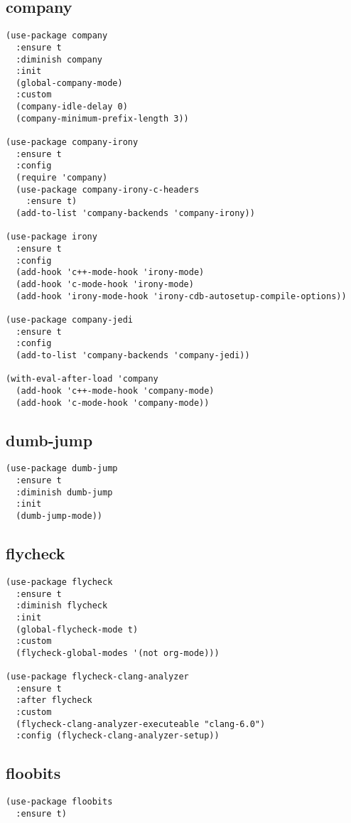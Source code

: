 \documentclass[11pt]{article}
\begin{document}
\subsection{company}
\label{sec-2-7}
\begin{verbatim}
(use-package company
  :ensure t
  :diminish company
  :init
  (global-company-mode)
  :custom
  (company-idle-delay 0)
  (company-minimum-prefix-length 3))

(use-package company-irony
  :ensure t
  :config
  (require 'company)
  (use-package company-irony-c-headers
    :ensure t)
  (add-to-list 'company-backends 'company-irony))

(use-package irony
  :ensure t
  :config
  (add-hook 'c++-mode-hook 'irony-mode)
  (add-hook 'c-mode-hook 'irony-mode)
  (add-hook 'irony-mode-hook 'irony-cdb-autosetup-compile-options))

(use-package company-jedi
  :ensure t
  :config
  (add-to-list 'company-backends 'company-jedi))

(with-eval-after-load 'company
  (add-hook 'c++-mode-hook 'company-mode)
  (add-hook 'c-mode-hook 'company-mode))
\end{verbatim}
\subsection{dumb-jump}
\label{sec-2-8}
\begin{verbatim}
(use-package dumb-jump
  :ensure t
  :diminish dumb-jump
  :init
  (dumb-jump-mode))
\end{verbatim}
\subsection{flycheck}
\label{sec-2-9}
\begin{verbatim}
(use-package flycheck
  :ensure t
  :diminish flycheck
  :init
  (global-flycheck-mode t)
  :custom
  (flycheck-global-modes '(not org-mode)))

(use-package flycheck-clang-analyzer
  :ensure t 
  :after flycheck
  :custom
  (flycheck-clang-analyzer-executeable "clang-6.0")
  :config (flycheck-clang-analyzer-setup))
\end{verbatim}
\subsection{floobits}
\label{sec-2-10}
\begin{verbatim}
(use-package floobits
  :ensure t)
\end{verbatim}
\end{document}
